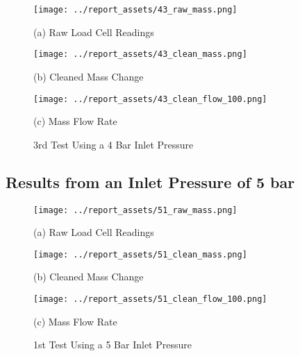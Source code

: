 \begin{figure}[htbp]
    \centering

    \begin{minipage}{0.32\textwidth}
        \centering
        \texttt{[image: ../report\_assets/43\_raw\_mass.png]}
        \caption*{(a) Raw Load Cell Readings}
    \end{minipage}
    \hfill
    \begin{minipage}{0.32\textwidth}
        \centering
        \texttt{[image: ../report\_assets/43\_clean\_mass.png]}
        \caption*{(b) Cleaned Mass Change}
    \end{minipage}
    \hfill
    \begin{minipage}{0.32\textwidth}
        \centering
        \texttt{[image: ../report\_assets/43\_clean\_flow\_100.png]}
        \caption*{(c) Mass Flow Rate}
    \end{minipage}
    \caption{3rd Test Using a 4 Bar Inlet Pressure}
    
\end{figure}\label{fig:43}
\vfill

\newpage

\subsection{Results from an Inlet Pressure of 5 bar}
\vfill
\begin{figure}[htbp]
    \centering

    \begin{minipage}{0.32\textwidth}
        \centering
        \texttt{[image: ../report\_assets/51\_raw\_mass.png]}
        \caption*{(a) Raw Load Cell Readings}
    \end{minipage}
    \hfill
    \begin{minipage}{0.32\textwidth}
        \centering
        \texttt{[image: ../report\_assets/51\_clean\_mass.png]}
        \caption*{(b) Cleaned Mass Change}
    \end{minipage}
    \hfill
    \begin{minipage}{0.32\textwidth}
        \centering
        \texttt{[image: ../report\_assets/51\_clean\_flow\_100.png]}
        \caption*{(c) Mass Flow Rate}
    \end{minipage}
    \caption{1st Test Using a 5 Bar Inlet Pressure}
    
\end{figure}\label{fig:51}
\vfill

